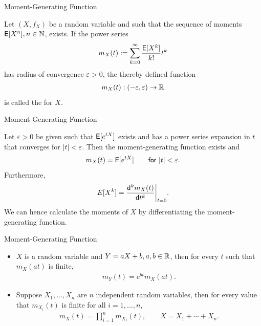 \begin{frame}{Moment-Generating Function}

\justifying
{} Let $(X, f_X)$ be a random variable and such that the sequence of moments $\mathsf{E}[X^n], n\in \mathbb{N}$, exists. If the power series 
\begin{align*}
m_X(t) := \sum_{k=0}^{\infty} \frac{\mathsf{E}[X^k]}{k!} t^k
\end{align*}
has radius of convergence $\varepsilon > 0$, the thereby defined function
\begin{align*}
m_X(t): (-\varepsilon, \varepsilon) \rightarrow \mathbb{R}
\end{align*}
is called the  for $X$.

\end{frame}


\begin{frame}{Moment-Generating Function}

\justifying
{} Let $\varepsilon > 0$ be given such that $\mathsf{E}[e^{tX}]$ exists and has a power series expansion in $t$ that converges for $|t| < \varepsilon$. Then the moment-generating function exists and 
\begin{align*}
m_X(t) = \mathsf{E}[e^{tX}] \qquad \mathsf{for\ } |t| < \varepsilon.
\end{align*}
Furthermore, 
\begin{align*}
E[X^k] = \frac{\mathsf{d}^k m_X(t)}{\mathsf{d}t^k}\bigg|_{t=0}.
\end{align*}
We can hence calculate the moments of $X$ by differentiating the moment-generating function.

\end{frame}

\begin{frame}{Moment-Generating Function}

\begin{itemize}
	\justifying
	\item $X$ is a random variable and $Y = aX + b, a, b\in \mathbb{R}$, then for every $t$ such that $m_X(at)$ is finite,
	\begin{align*}
	m_Y(t) = e^{bt} m_X(at).
	\end{align*}
	\item Suppose $X_1, \ldots, X_n$ are $n$ independent random variables, then for every value that $m_{X_i}(t)$ is finite for all $i = 1, \ldots, n$,
	\begin{align*}
	m_X(t) = \prod_{i=1}^n m_{X_i}(t), \qquad X = X_1 + \cdots + X_n.
	\end{align*}
\end{itemize}

\end{frame}


